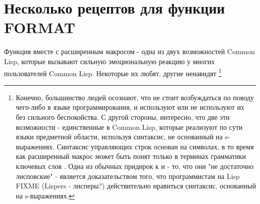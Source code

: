 \chapter{Несколько рецептов для функции FORMAT}
\label{ch:18}

Функция  вместе с расширенным макросом  - одна из двух
возможностей Common Lisp, которые вызывают сильную эмоциональную реакцию у многих
пользователей Common Lisp. Некоторые их любят, другие ненавидят \footnote{Конечно,
  большинство людей осознают, что не стоит возбуждаться по поводу чего-либо в языке
  программирования, и используют или не используют их без сильного беспокойства. С другой
  стороны, интересно, что две эти возможности - единственные в Common Lisp, которые
  реализуют по сути языки предметной области, используя синтаксис, не основанный на
  s-выражениях. Синтаксис управляющих строк  основан на символах, в то время
  как расширенный макрос  может быть понят только в терминах грамматики
  ключевых слов . Одна из обычных придирок к  и  - то,
  что они "не достаточно лисповские" - является доказательством того, что программистам на
  Lisp FIXME (Lispers - лисперы?)  действительно нравиться синтаксис, основанный на
  s-выражениях.}

